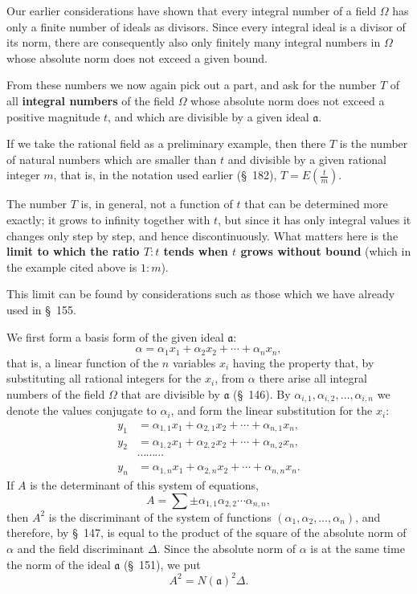 \documentclass[11pt]{article}
\begin{document}
Our earlier considerations have shown that every integral number of a field $\Omega$ has only a finite number of ideals as divisors. Since every integral ideal is a divisor of its norm, there are consequently also only finitely many integral numbers in $\Omega$ whose absolute norm does not exceed a given bound.

From these numbers we now again pick out a part, and ask for the number $T$ of all \textbf{integral numbers} of the field $\Omega$ whose absolute norm does not exceed a positive magnitude $t$, and which are divisible by a given ideal $\mathfrak a$.

If we take the rational field as a preliminary example, then there $T$ is the number of natural numbers which are smaller than $t$ and divisible by a given rational integer $m$, that is, in the notation used earlier (\S~182), $T=E\left(\frac{t}{m}\right)$.

The number $T$ is, in general, not a function of $t$ that can be determined more exactly; it grows to infinity together with $t$, but since it has only integral values it changes only step by step, and hence discontinuously. What matters here is the \textbf{limit to which the ratio $T:t$ tends when $t$ grows without bound} (which in the example cited above is $1:m$).

This limit can be found by considerations such as those which we have already used in \S~155.

We first form a basis form of the given ideal $\mathfrak a$:
\begin{equation}
\alpha=\alpha_1x_1+\alpha_2x_2+\cdots+\alpha_nx_n,
\tag{1}
\end{equation}
that is, a linear function of the $n$ variables $x_i$ having the property that, by substituting all rational integers for the $x_i$, from $\alpha$ there arise all integral numbers of the field $\Omega$ that are divisible by $\mathfrak a$ (\S~146). By $\alpha_{i,1},\alpha_{i,2},\ldots,\alpha_{i,n}$ we denote the values conjugate to $\alpha_i$, and form the linear substitution for the $x_i$:
\begin{equation}
\begin{aligned}
y_1&=\alpha_{1,1}x_1+\alpha_{2,1}x_2+\cdots+\alpha_{n,1}x_n,\\
y_2&=\alpha_{1,2}x_1+\alpha_{2,2}x_2+\cdots+\alpha_{n,2}x_n,\\
&\cdots\cdots\cdots\\
y_n&=\alpha_{1,n}x_1+\alpha_{2,n}x_2+\cdots+\alpha_{n,n}x_n.
\end{aligned}
\tag{2}
\end{equation}
If $A$ is the determinant of this system of equations,
\[
A=\sum\pm\alpha_{1,1}\alpha_{2,2}\cdots\alpha_{n,n},
\]
then $A^2$ is the discriminant of the system of functions $(\alpha_1,\alpha_2,\ldots,\alpha_n)$, and therefore, by \S~147, is equal to the product of the square of the absolute norm of $\alpha$ and the field discriminant $\Delta$. Since the absolute norm of $\alpha$ is at the same time the norm of the ideal $\mathfrak a$ (\S~151), we put
\begin{equation}
A^2=N(\mathfrak a)^2\Delta.
\tag{3}
\end{equation}
\end{document}

